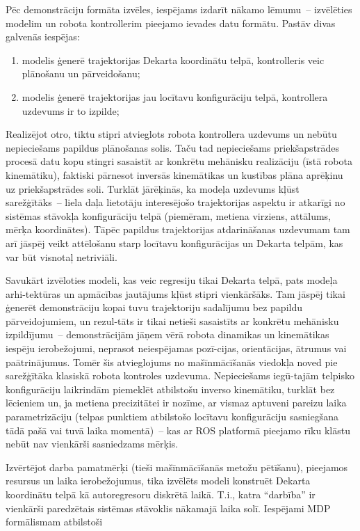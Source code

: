 \documentclass[12pt, a4paper]{article}
\numberwithin{equation}{section} %
\begin{document}
Pēc demonstrāciju formāta izvēles, iespējams izdarīt nākamo lēmumu~-- izvēlēties modelim un robota kontrollerim pieejamo ievades datu formātu. Pastāv divas galvenās iespējas:

\begin{enumerate}
    \item modelis ģenerē trajektorijas Dekarta koordinātu telpā, kontrolleris veic plānošanu un pārveidošanu;
    \item modelis ģenerē trajektorijas jau locītavu konfigurāciju telpā, kontrollera uzdevums ir to izpilde;
\end{enumerate}

Realizējot otro, tiktu stipri atvieglots robota kontrollera uzdevums un nebūtu nepieciešams papildus plānošanas solis. Taču tad nepieciešams priekšapstrādes procesā datu kopu stingri sasaistīt ar konkrētu mehānisku realizāciju (īstā robota kinemātiku), faktiski pārnesot inversās kinemātikas un kustības plāna aprēķinu uz priekšapstrādes soli. Turklāt jārēķinās, ka modeļa uzdevums kļūst sarežģītāks~-- liela daļa lietotāju interesējošo trajektorijas aspektu ir atkarīgi no sistēmas stāvokļa konfigurāciju telpā (piemēram, metiena virziens, attālums, mērķa koordinātes). Tāpēc papildus trajektorijas atdarināšanas uzdevumam tam arī jāspēj veikt attēlošanu starp locītavu konfigurācijas un Dekarta telpām, kas var būt visnotaļ netriviāli.  

Savukārt izvēloties modeli, kas veic regresiju tikai Dekarta telpā, pats modeļa arhi-tektūras un apmācības jautājums kļūst stipri vienkāršāks. Tam jāspēj tikai ģenerēt demonstrāciju kopai tuvu trajektoriju sadalījumu bez papildu pārveidojumiem, un rezul-tāts ir tikai netieši sasaistīts ar konkrētu mehānisku izpildījumu~-- demonstrācijām jāņem vērā robota dinamikas un kinemātikas iespēju ierobežojumi, neprasot neiespējamas pozī-cijas, orientācijas, ātrumus vai paātrinājumus. Tomēr šis atvieglojums no mašīnmācīšanās viedokļa noved pie sarežģītāka klasiskā robota kontroles uzdevuma. Nepieciešams iegū-tajām telpisko konfigurāciju laikrindām piemeklēt atbilstošu inverso kinemātiku, turklāt bez lēcieniem un, ja metiena precizitātei ir nozīme, ar vismaz aptuveni pareizu laika parametrizāciju (telpas punktiem atbilstošo locītavu konfigurāciju sasniegšana tādā pašā vai tuvā laika momentā)~-- kas ar ROS platformā pieejamo rīku klāstu nebūt nav vienkārši sasniedzams mērķis.

Izvērtējot darba pamatmērķi (tieši mašīnmācīšanās metožu pētīšanu), pieejamos resursus un laika ierobežojumus, tika izvēlēts modeli konstruēt Dekarta koordinātu telpā kā autoregresoru diskrētā laikā. T.i., katra ``darbība'' ir vienkārši paredzētais sistēmas stāvoklis nākamajā laika solī. Iespējami MDP formālismam atbilstoši
\end{document}
